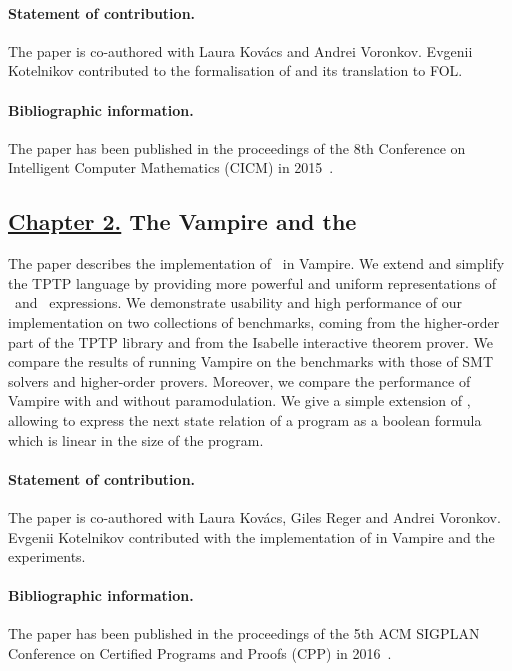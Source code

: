 \paragraph{Statement of contribution.} The paper is co-authored with Laura Kov\'{a}cs and Andrei Voronkov. Evgenii Kotelnikov contributed to the formalisation of \folb{} and its translation to FOL.

\paragraph{Bibliographic information.} The paper has been published in the proceedings of the 8th Conference on Intelligent Computer Mathematics (CICM) in 2015~\cite{FOOL}.

\subsection*{\hyperref[chap:implementation]{Chapter 2.} The Vampire and the \folb{}}
The paper describes the implementation of \folb\ in Vampire. We extend and simplify the TPTP language by providing more powerful and uniform representations of \ITE\ and \LETIN\ expressions. We demonstrate usability and high performance of our implementation on two collections of benchmarks, coming from the higher-order part of the TPTP library and from the Isabelle interactive theorem prover. We compare the results of running Vampire on the benchmarks with those of SMT solvers and higher-order provers. Moreover, we compare the performance of Vampire with and without \folb{} paramodulation. We give a simple extension of \folb, allowing to express the next state relation of a program as a boolean formula which is linear in the size of the program.

\paragraph{Statement of contribution.} The paper is co-authored with Laura Kov\'{a}cs, Giles Reger and Andrei Voronkov. Evgenii Kotelnikov contributed with the implementation of \folb{} in Vampire and the experiments.

\paragraph{Bibliographic information.} The paper has been published in the proceedings of the 5th ACM SIGPLAN Conference on Certified Programs and Proofs (CPP) in 2016~\cite{VampireAndFOOL}.

